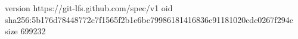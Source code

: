 version https://git-lfs.github.com/spec/v1
oid sha256:5b176d78448772c7f1565f2b1e6bc79986181416836c91181020cdc0267f294c
size 699232
